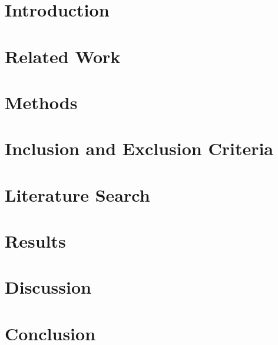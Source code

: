 




	
	\maketitle
	
	
	
	\section{Introduction}
		
	
	\section{Related Work}
		
	
	\section{Methods}
		
	
	\section{Inclusion and Exclusion Criteria}
		
	
	\section{Literature Search}
		
	
	\section{Results}
		
	
	\section{Discussion}
		
	
	\section{Conclusion}
		
	
	
	

